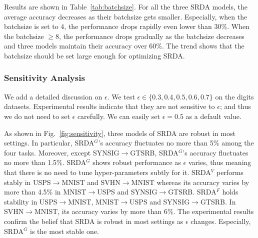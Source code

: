 \documentclass[journal,twocolumn]{IEEEtran}
\theoremstyle{definition}
\begin{document}
Results are shown in Table~\ref{tab:batchsize}. For all the three SRDA models, the average accuracy decreases as their batchsize gets smaller. Especially, when the batchsize is set to $4$, the performance drops rapidly even lower than $30\%$. When the batchsize $\geq8$, the performance drops gradually  as the batchsize decreases and three models maintain their accuracy over $60\%$. The trend shows that the batchsize should be set large enough for optimizing SRDA.
\begin{table}[htbp]
\centering
\caption{Classification accuracy percentage of VisDA classification experiment for different batchsize.}
\label{tab:batchsize}
\end{table}

\subsubsection{Sensitivity Analysis}

We add a detailed discussion on $\epsilon$. We test $\epsilon\in\{0.3, 0.4, 0.5, 0.6, 0.7\}$ on the digits datasets. Experimental results indicate that they are not sensitive to $\epsilon$; and thus we do not need to set $\epsilon$ carefully. We can easily set $\epsilon = 0.5$ as a default value. 

As shown in Fig.~\ref{fig:sensitivity}, three models of SRDA are robust in most settings. In particular, SRDA$^G$'s accuracy fluctuates no more than 5\% among the four tasks. Moreover, except SYNSIG$\rightarrow$GTSRB, SRDA$^G$'s accuracy fluctuates no more than 1.5\%. SRDA$^G$ shows robust performance as $\epsilon$ varies, thus meaning that there is no need to tune hyper-parameters subtly for it. SRDA$^V$ performs stably in USPS$\rightarrow$MNIST and SVHN$\rightarrow$MNIST whereas its accuracy varies by more than 4.5\% in MNIST$\rightarrow$USPS and SYNSIG$\rightarrow$GTSRB. SRDA$^F$ holds stability in USPS$\rightarrow$MNIST, MNIST$\rightarrow$USPS and SYNSIG$\rightarrow$GTSRB. In SVHN$\rightarrow$MNIST, its accuracy varies by more than 6\%. The experimental results confirm the belief that SRDA is robust in most settings as $\epsilon$ changes. Especially, SRDA$^G$ is the most stable one. 
\end{document}
